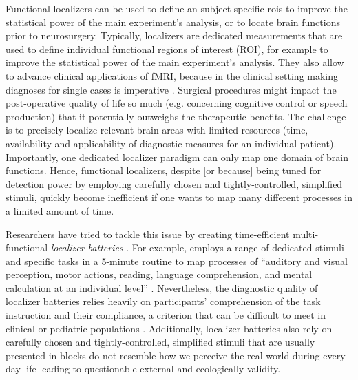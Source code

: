 Functional localizers can be used to define an subject-specific \acp{roi} to
improve the statistical power of the main experiment's analysis, or to locate
brain functions prior to neurosurgery.
%
Typically, localizers are dedicated measurements that are used to define
individual functional regions of interest (ROI), for example to improve the
statistical power of the main experiment's analysis.
%
They also allow to advance clinical applications of fMRI, because in the
clinical setting making diagnoses for single cases is imperative
\citep{wegrzyn2018thought}.
Surgical procedures might impact the post-operative quality of life so much
(e.g. concerning cognitive control or speech production) that it potentially
outweighs the therapeutic benefits.
The challenge is to precisely localize relevant brain areas with limited
resources (time, availability and applicability of diagnostic measures for an
individual patient).
Importantly, one dedicated localizer paradigm can only map one domain of brain
functions.
Hence, functional localizers, despite [or because] being tuned for detection
power by employing carefully chosen and tightly-controlled, simplified stimuli,
quickly become inefficient if one wants to map many different processes in a
limited amount of time.


Researchers have tried to tackle this issue by creating time-efficient
multi-functional \textit{localizer batteries} \citep{barch2013function,
drobyshevsky2006rapid, pinel2007fast}.
For example, \citet{pinel2007fast} employs a range of dedicated stimuli and
specific tasks in a 5-minute routine to map processes of ``auditory and visual
perception, motor actions, reading, language comprehension, and mental
calculation at an individual level'' \citet{pinel2007fast}.
Nevertheless, the diagnostic quality of localizer batteries relies heavily on
participants' comprehension of the task instruction and their compliance, a
criterion that can be difficult to meet in clinical or pediatric populations
\citep{eickhoff2020towards, vanderwal2015inscapes, vanderwal2019movies}.
Additionally, localizer batteries also rely on carefully chosen and
tightly-controlled, simplified stimuli that are usually presented in blocks do
not resemble how we perceive the real-world during every-day life leading to
questionable external and ecologically validity.

